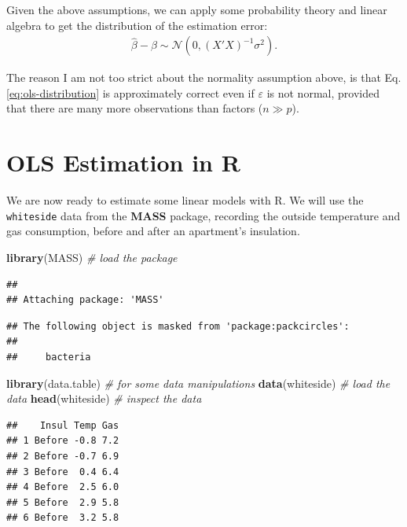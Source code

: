 \documentclass[]{book}
\newenvironment{Shaded}{\begin{snugshade}}{\end{snugshade}}
\newcommand{\CommentTok}[1]{\textcolor[rgb]{0.56,0.35,0.01}{\textit{#1}}}
\newcommand{\KeywordTok}[1]{\textcolor[rgb]{0.13,0.29,0.53}{\textbf{#1}}}
\newcommand{\NormalTok}[1]{#1}
\theoremstyle{definition}
\theoremstyle{definition}
\theoremstyle{definition}
\theoremstyle{remark}
\begin{document}
Given the above assumptions, we can apply some probability theory and linear algebra to get the distribution of the estimation error:
\begin{align}
  \hat \beta - \beta \sim \mathcal{N}(0, (X'X)^{-1} \sigma^2).
  \label{eq:ols-distribution}
\end{align}

The reason I am not too strict about the normality assumption above, is that Eq.\eqref{eq:ols-distribution} is approximately correct even if \(\varepsilon\) is not normal, provided that there are many more observations than factors (\(n \gg p\)).

\hypertarget{ols-estimation-in-r}{%
\section{OLS Estimation in R}\label{ols-estimation-in-r}}

We are now ready to estimate some linear models with R.
We will use the \texttt{whiteside} data from the \textbf{MASS} package, recording the outside temperature and gas consumption, before and after an apartment's insulation.

\begin{Shaded}
\begin{Highlighting}[]
\KeywordTok{library}\NormalTok{(MASS) }\CommentTok{# load the package}
\end{Highlighting}
\end{Shaded}

\begin{verbatim}
## 
## Attaching package: 'MASS'
\end{verbatim}

\begin{verbatim}
## The following object is masked from 'package:packcircles':
## 
##     bacteria
\end{verbatim}

\begin{Shaded}
\begin{Highlighting}[]
\KeywordTok{library}\NormalTok{(data.table) }\CommentTok{# for some data manipulations}
\KeywordTok{data}\NormalTok{(whiteside) }\CommentTok{# load the data}
\KeywordTok{head}\NormalTok{(whiteside) }\CommentTok{# inspect the data}
\end{Highlighting}
\end{Shaded}

\begin{verbatim}
##    Insul Temp Gas
## 1 Before -0.8 7.2
## 2 Before -0.7 6.9
## 3 Before  0.4 6.4
## 4 Before  2.5 6.0
## 5 Before  2.9 5.8
## 6 Before  3.2 5.8
\end{verbatim}
\end{document}
